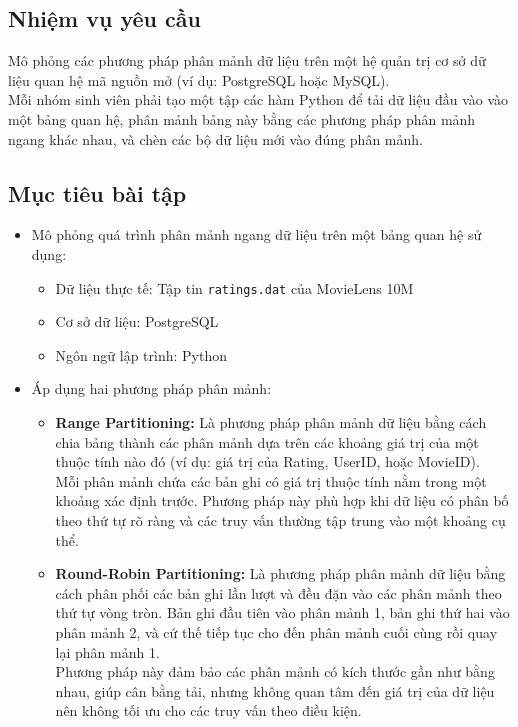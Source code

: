 \documentclass[14pt]{extarticle}
\begin{document}
\subsection{Nhiệm vụ yêu cầu}
Mô phỏng các phương pháp phân mảnh dữ liệu trên một hệ quản trị cơ sở dữ liệu quan hệ mã nguồn mở (ví dụ: PostgreSQL hoặc MySQL).\\
Mỗi nhóm sinh viên phải tạo một tập các hàm Python để tải dữ liệu đầu vào vào một bảng quan hệ, phân mảnh bảng này bằng các phương pháp phân mảnh ngang khác nhau, và chèn các bộ dữ liệu mới vào đúng phân mảnh.
\subsection{Mục tiêu bài tập}
\begin{itemize}
    \item Mô phỏng quá trình phân mảnh ngang dữ liệu trên một bảng quan hệ sử dụng:
    \begin{itemize}
        \item Dữ liệu thực tế: Tập tin \texttt{ratings.dat} của MovieLens 10M
        \item Cơ sở dữ liệu: PostgreSQL
        \item Ngôn ngữ lập trình: Python
    \end{itemize}
    \item Áp dụng hai phương pháp phân mảnh:
    \begin{itemize}
        \item \textbf{Range Partitioning:} Là phương pháp phân mảnh dữ liệu bằng cách chia bảng thành các phân mảnh dựa trên các khoảng giá trị của một thuộc tính nào đó (ví dụ: giá trị của Rating, UserID, hoặc MovieID).\\
        Mỗi phân mảnh chứa các bản ghi có giá trị thuộc tính nằm trong một khoảng xác định trước. Phương pháp này phù hợp khi dữ liệu có phân bố theo thứ tự rõ ràng và các truy vấn thường tập trung vào một khoảng cụ thể.
        \item \textbf{Round-Robin Partitioning:} Là phương pháp phân mảnh dữ liệu bằng cách phân phối các bản ghi lần lượt và đều đặn vào các phân mảnh theo thứ tự vòng tròn. Bản ghi đầu tiên vào phân mảnh 1, bản ghi thứ hai vào phân mảnh 2, và cứ thế tiếp tục cho đến phân mảnh cuối cùng rồi quay lại phân mảnh 1.\\
        Phương pháp này đảm bảo các phân mảnh có kích thước gần như bằng nhau, giúp cân bằng tải, nhưng không quan tâm đến giá trị của dữ liệu nên không tối ưu cho các truy vấn theo điều kiện.
    \end{itemize}

\end{itemize}
\end{document}
